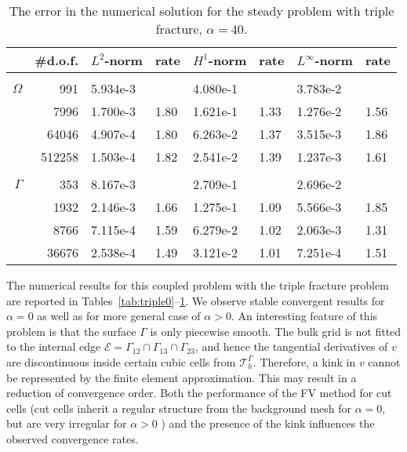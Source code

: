\documentclass{article}
\newcommand{\T}{\mathcal T}
\begin{document}
\begin{table}[t]
\begin{center}
\caption{The error in the numerical solution for the steady problem with  triple fracture, $\alpha = 40$.
\label{tab:triple40}}\smallskip
\small
\begin{tabular}{rr|llllll}\hline
&\#d.o.f. & $L^2$-norm & rate & $H^1$-norm& rate & $L^\infty$-norm& rate \\ \hline\\[-2ex]
{$\Omega$}
&991&	 5.934e-3   &       & 4.080e-1&      &  3.783e-2 &     \\
&7996&	 1.700e-3   & 1.80  & 1.621e-1& 1.33 &  1.276e-2 & 1.56\\
&64046&  4.907e-4   & 1.80  & 6.263e-2& 1.37 &  3.515e-3 & 1.86\\
&512258& 1.503e-4   & 1.82  & 2.541e-2& 1.39 &  1.237e-3 & 1.61\\  \hline\\[-2ex]
{$\Gamma$}
&353&     8.167e-3 &       &2.709e-1&     & 2.696e-2 &      \\
&1932&	  2.146e-3 & 1.66  &1.275e-1& 1.09& 5.566e-3 & 1.85 \\
&8766&    7.115e-4 & 1.59  &6.279e-2& 1.02& 2.063e-3 & 1.31 \\
&{36676}&   {2.538e-4} & {1.49}  &{3.121e-2}& {1.01}& {7.251e-4} & {1.51} \\  \hline
\end{tabular}
\end{center}
\end{table}
\label{s_ex2}

The numerical results for this coupled problem with the triple fracture problem are reported in Tables~\ref{tab:triple0}--\ref{tab:triple40}.  We observe stable convergent results for $\alpha=0$ as well as for more general case of $\alpha>0$.   An interesting feature of this problem is that the surface $\Gamma$ is
only piecewise smooth.  The bulk grid is not fitted to the internal edge $\mathcal{E}=\Gamma_{12}\cap\Gamma_{13}\cap\Gamma_{23}$,
and hence the tangential derivatives of $v$ are discontinuous inside certain cubic cells from $\T_h^\Gamma$.
{Therefore, a kink in $v$ cannot be represented by the finite element approximation.} This {may} result in  {a}  reduction of convergence order. {Both the performance of the FV method for cut  cells (cut cells inherit a regular structure from the background mesh for $\alpha=0$, but are very irregular for $\alpha>0$ ) and the presence of the kink influences the observed convergence rates. }
\end{document}

